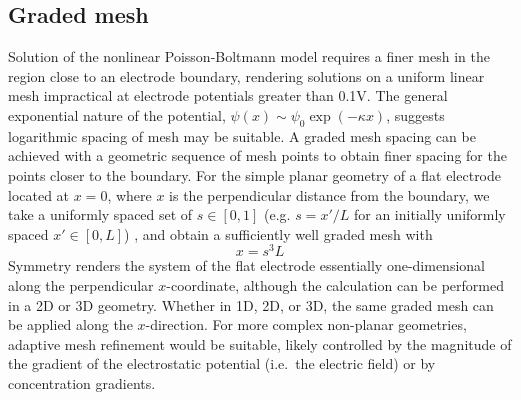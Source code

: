 \subsection{Graded mesh}
Solution of the nonlinear Poisson-Boltmann model requires a finer mesh in the  region
close to an electrode boundary, rendering solutions on a uniform linear mesh  impractical at electrode
potentials greater than 0.1V.  The general exponential nature of the potential,
$\psi(x) \sim \psi_{0} \exp(-\kappa x)$, suggests logarithmic spacing of
mesh may be suitable.
A graded mesh spacing can be achieved with a geometric sequence of
mesh points  to obtain finer spacing for the points closer to the boundary.
For the simple planar geometry of a flat electrode located at $x=0$,
where $x$ is the perpendicular distance from the boundary,
we take a uniformly spaced set of $s \in [0,1]$  (e.g. $s=x'/L$ for an
initially uniformly spaced $x'\in [0,L]$) , and obtain a sufficiently
well graded mesh with
\begin{equation}
  x = s^3 L
\end{equation}
Symmetry renders the system of the flat electrode essentially one-dimensional along the
perpendicular $x$-coordinate, although the calculation can be performed in a 2D
or 3D geometry. Whether in 1D, 2D, or 3D, the same graded mesh can be
applied  along the  $x$-direction.
For more complex non-planar geometries, adaptive mesh refinement would
be suitable, likely controlled by the magnitude of the gradient of the
electrostatic potential (i.e.\ the electric field) or by concentration
gradients.

